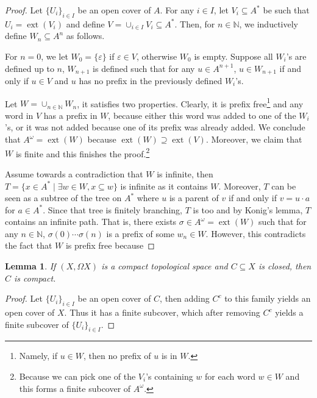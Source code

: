 \documentclass{tufte-handout} %
\newtheorem{lem}[thm]{Lemma}
\theoremstyle{definition}
\theoremstyle{remark}
\newcommand{\N}{\mathbb{N}}
\newcommand{\0}{\textsf{0}}
\newcommand{\1}{\textsf{1}}
\DeclareMathOperator{\ext}{ext}
\begin{document}
\begin{proof}
	Let $\{U_i\}_{i \in I}$ be an open cover of $A$. For any $i \in I$, let $V_i \subseteq A^*$ be such that $U_i = \ext(V_i)$ and define $V = \cup_{i \in I} V_i \subseteq A^*$.
	Then, for $n \in \N$, we inductively define $W_n \subseteq A^n$ as follows.
	
	For $n = 0$, we let $W_0 = \{\varepsilon\}$ if $\varepsilon \in V$, otherwise $W_0$ is empty. Suppose all $W_i$'s are defined up to $n$, $W_{n+1}$ is defined such that for any $u \in A^{n+1}$, $u \in W_{n+1}$ if and only if $u \in V$ and $u$ has no prefix in the previously defined $W_i$'s.
	
	Let $W = \cup_{n \in \N} W_n$, it satisfies two properties. Clearly, it is prefix free\footnote{Namely, if $u\in W$, then no prefix of $u$ is in $W$.} and any word in $V$ has a prefix in $W$, because either this word was added to one of the $W_i$'s, or it was not added because one of its prefix was already added. We conclude that $A^{\omega} = \ext(W)$ because $\ext(W) \supseteq \ext(V)$. Moreover, we claim that $W$ is finite and this finishes the proof.\footnote{Because we can pick one of the $V_i$'s containing $w$ for each word $w \in W$ and this forms a finite subcover of $A^{\omega}$.}
	
	Assume towards a contradiction that $W$ is infinite, then $T = \{x \in A^* \mid \exists w \in W, x \subseteq w\}$ is infinite as it contains $W$. Moreover, $T$ can be seen as a subtree of the tree on $A^*$ where $u$ is a parent of $v$ if and only if $v = u\cdot a$ for $a \in A^*$. Since that tree is finitely branching, $T$ is too and by Konig's lemma, $T$ contains an infinite path. That is, there exists $\sigma \in A^{\omega} = \ext(W)$ such that for any $n \in \N$, $\sigma(0)\cdots \sigma(n)$ is a prefix of some $w_n \in W$. However, this contradicts the fact that $W$ is prefix free because %
\end{proof}
\begin{lem}\label{lem-closiscomp}
	If $(X, \Omega X)$ is a compact topological space and $C \subseteq X$ is closed, then $C$ is compact.
\end{lem}
\begin{proof}
	Let $\{U_i\}_{i \in I}$ be an open cover of $C$, then adding $C^c$ to this family yields an open cover of $X$. Thus it has a finite subcover, which after removing $C^c$ yields a finite subcover of $\{U_i\}_{i \in I}$.
\end{proof}
\end{document}
